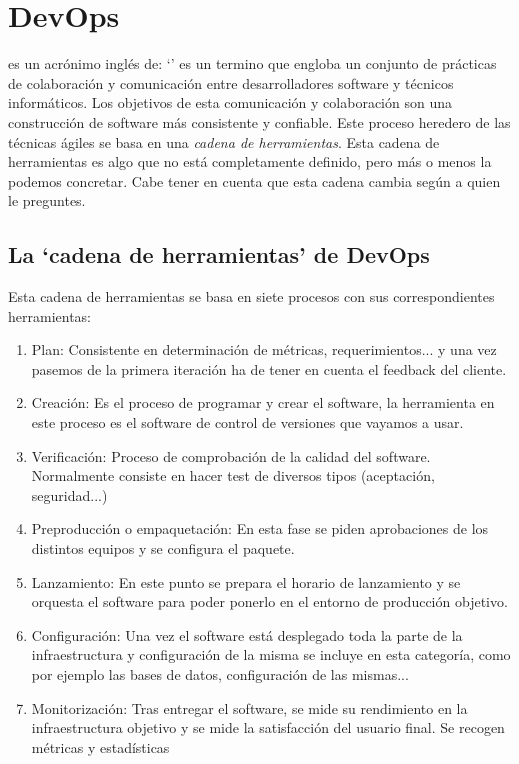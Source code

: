 \section{DevOps}

 es un acrónimo inglés de: `' es un termino que engloba un conjunto de prácticas de colaboración y comunicación entre desarrolladores software y técnicos informáticos. Los objetivos de esta comunicación y colaboración son una construcción de software más consistente y confiable. Este proceso heredero de las técnicas ágiles se basa en una \textit{cadena de herramientas}. Esta cadena de herramientas es algo que no está completamente definido, pero más o menos la podemos concretar. Cabe tener en cuenta que esta cadena cambia según a quien le preguntes.

\subsection{La `cadena de herramientas' de DevOps}

Esta cadena de herramientas se basa en siete procesos con sus correspondientes herramientas:

\begin{enumerate}
 \item Plan: Consistente en determinación de métricas, requerimientos... y una vez pasemos de la primera iteración ha de tener en cuenta el feedback del cliente.
 \item Creación: Es el proceso de programar y crear el software, la herramienta en este proceso es el software de control de versiones que vayamos a usar.
 \item Verificación: Proceso de comprobación de la calidad del software. Normalmente consiste en hacer test de diversos tipos (aceptación, seguridad...)
 \item Preproducción o empaquetación: En esta fase se piden aprobaciones de los distintos equipos y se configura el paquete.
 \item Lanzamiento: En este punto se prepara el horario de lanzamiento y se orquesta el software para poder ponerlo en el entorno de producción objetivo.
 \item Configuración: Una vez el software está desplegado toda la parte de la infraestructura y configuración de la misma se incluye en esta categoría, como por ejemplo las bases de datos, configuración de las mismas...
 \item Monitorización: Tras entregar el software, se mide su rendimiento en la infraestructura objetivo y se mide la satisfacción del usuario final. Se recogen métricas y estadísticas
\end{enumerate}


